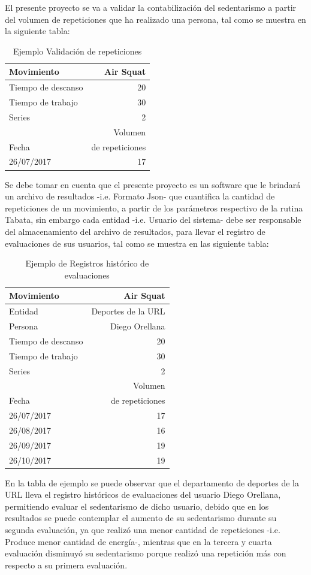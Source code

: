 \documentclass[twoside,twocolumn]{article}
\begin{document}
\medbreak
El presente proyecto se va a validar la contabilización del sedentarismo a partir del volumen de repeticiones que ha realizado una persona, tal como se muestra en la siguiente tabla:
\begin{table}[H]
\caption{Ejemplo Validación de repeticiones}
\centering
\begin{tabular}{lr}
\toprule
Movimiento & Air Squat \\
\midrule
Tiempo de descanso & 20 \\
Tiempo de trabajo & 30 \\
Series & 2 \\
\midrule
 & Volumen  \\
Fecha & de repeticiones \\
26/07/2017 & 17 \\
\bottomrule
\end{tabular}
\end{table}
Se debe tomar en cuenta que el presente proyecto es un software que le brindará un archivo de resultados -i.e. Formato Json- que cuantifica la cantidad de repeticiones de un movimiento, a partir de los parámetros respectivo de la rutina Tabata, sin embargo cada entidad -i.e. Usuario del sistema- debe ser responsable del almacenamiento del archivo de resultados, para llevar el registro de evaluaciones de sus usuarios, tal como se muestra en las siguiente tabla: 
\begin{table}[H]
\caption{Ejemplo de Registros histórico de evaluaciones}
\centering
\begin{tabular}{lr}
\toprule
Movimiento & Air Squat \\
\midrule
Entidad & Deportes de la URL \\
Persona & Diego Orellana \\
\midrule
Tiempo de descanso & 20 \\
Tiempo de trabajo & 30 \\
Series & 2 \\
\midrule
 & Volumen  \\
Fecha &  de repeticiones \\
26/07/2017 & 17 \\
26/08/2017 & 16 \\
26/09/2017 & 19 \\
26/10/2017 & 19 \\
\bottomrule
\end{tabular}
\end{table}
En la tabla de ejemplo se puede observar que el departamento de deportes de la URL lleva el registro históricos de evaluaciones del usuario Diego Orellana, permitiendo evaluar el sedentarismo de dicho usuario, debido que en los resultados se puede contemplar el aumento de su sedentarismo durante su segunda evaluación, ya que realizó una menor cantidad de repeticiones -i.e. Produce menor cantidad de energía-, mientras que en la tercera y cuarta evaluación disminuyó su sedentarismo porque realizó una repetición más con respecto a su primera evaluación. 
\end{document}
